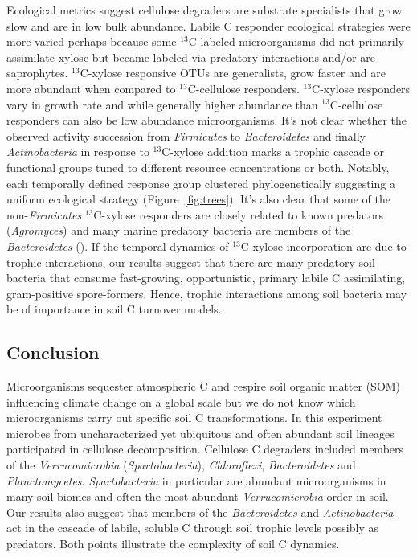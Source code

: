 Ecological metrics suggest cellulose degraders are substrate specialists that
grow slow and are in low bulk abundance. Labile C responder ecological
strategies were more varied perhaps because some $^{13}$C labeled
microorganisms did not primarily assimilate xylose but became labeled via
predatory interactions and/or are saprophytes. $^{13}$C-xylose responsive OTUs
are generalists, grow faster and are more abundant when compared to
$^{13}$C-cellulose responders. $^{13}$C-xylose responders vary in growth rate
and while generally higher abundance than $^{13}$C-cellulose responders can
also be low abundance microorganisms. It's not clear whether the observed
activity succession from \textit{Firmicutes} to \textit{Bacteroidetes} and
finally \textit{Actinobacteria} in response to $^{13}$C-xylose addition marks
a trophic cascade or functional groups tuned to different resource
concentrations or both. Notably, each temporally defined response group
clustered phylogenetically suggesting a uniform ecological strategy
(Figure~\ref{fig:trees}). It's also clear that some of the
non-\textit{Firmicutes} $^{13}$C-xylose responders are closely related to known
predators (\textit{Agromyces}) and many marine predatory bacteria are
members of the \textit{Bacteroidetes} (\citep{Banning2010a}). If the
temporal dynamics of $^{13}$C-xylose incorporation are due to trophic
interactions, our results suggest that there are many predatory soil
bacteria that consume fast-growing, opportunistic, primary labile
C assimilating, gram-positive spore-formers. Hence, trophic interactions
among soil bacteria may be of importance in soil C turnover models.

\subsection{Conclusion} 
Microorganisms sequester atmospheric C and respire soil organic matter (SOM)
influencing climate change on a global scale but we do not know which
microorganisms carry out specific soil C transformations. In this experiment
microbes from uncharacterized yet ubiquitous and often abundant soil lineages
participated in cellulose decomposition. Cellulose C degraders included members
of the \textit{Verrucomicrobia} (\textit{Spartobacteria}),
\textit{Chloroflexi}, \textit{Bacteroidetes} and \textit{Planctomycetes}.
\textit{Spartobacteria} in particular are abundant microorganisms in many soil
biomes and often the most abundant \textit{Verrucomicrobia} order in soil. Our
results also suggest that members of the \textit{Bacteroidetes} and
\textit{Actinobacteria} act in the cascade of labile, soluble C through soil
trophic levels possibly as predators. Both points illustrate the complexity of
soil C dynamics.
